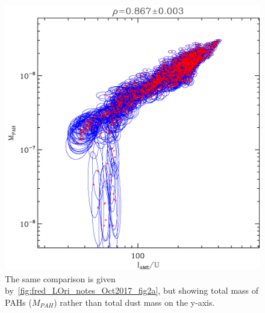               \begin{figure}
                \includegraphics[width=\textwidth]{../Plots/ch_lori/fred_LOri_notes_Oct2017_fig2b.pdf}
                \centering
                \caption{The same comparison is given by~\ref{fig:fred_LOri_notes_Oct2017_fig2a}, but showing total mass of PAHs ($M_{PAH}$) rather than total dust mass on the y-axis. }
                \label{fig:fred_LOri_notes_Oct2017_fig2b}
              \end{figure}
